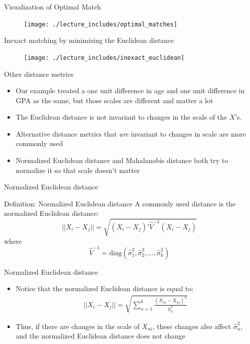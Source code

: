 \documentclass{beamer}
\begin{document}
\begin{frame}{Visualization of Optimal Match}

\begin{figure}[!t]\centering
\texttt{[image: ./lecture\_includes/optimal\_matches]}
\end{figure}

\end{frame}


 

\begin{frame}{Inexact matching by minimizing the Euclidean distance}

\begin{figure}[!t]\centering
\texttt{[image: ./lecture\_includes/inexact\_euclidean]}
\end{figure}

\end{frame}

\begin{frame}{Other distance metrics}

\begin{itemize}
\item Our example treated a one unit difference in age and one unit difference in GPA as the same, but those scales are different and matter a lot
\item The Euclidean distance is not invariant to changes in the scale of the $X$'s.  
\item Alternative distance metrics that \emph{are} invariant to changes in scale are more commonly used 
\item Normalized Euclidean distance and Mahalanobis distance both try to normalize it so that scale doesn't matter
\end{itemize}

\end{frame}


\begin{frame}{Normalized Euclidean distance}

	\begin{block}{Definition: Normalized Euclidean distance}
	  A commonly used distance is the normalized Euclidean distance:$$||X_i-X_j|| = \sqrt{ (X_i-X_j)'\widehat{V}^{-1}(X_i - X_j) }$$ where
		$$\widehat{V}^{-1} = \text{diag}(\widehat{\sigma}_1^2, \widehat{\sigma}_2^2, \dots, \widehat{\sigma}_k^2)$$
	\end{block}
\end{frame}

\begin{frame}{Normalized Euclidean distance}
	\begin{itemize}
	\item Notice that the normalized Euclidean distance is equal to:
		\begin{eqnarray*}
		||X_i - X_j|| = \sqrt{\sum_{n=1}^k \frac{(X_{ni} - X_{nj})^2}{\widehat{\sigma}^2_n}}
		\end{eqnarray*}
	\item Thus, if there are changes in the scale of $X_{ni}$, these changes also affect $\widehat{\sigma}^2_n$, and the normalized Euclidean distance does not change
	\end{itemize}

\end{frame}
\end{document}
